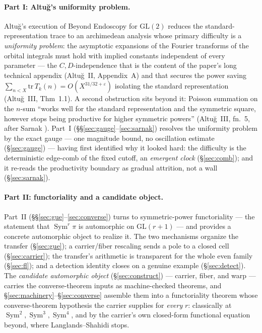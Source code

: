 \documentclass[11pt]{article}
\theoremstyle{definition}
\newcommand{\Sym}{\operatorname{Sym}}
\begin{document}
\paragraph{Part I: Altu\u{g}'s uniformity problem.} Altu\u{g}'s execution of Beyond Endoscopy for
$\mathrm{GL}(2)$ \cite{AltI,AltII,AltIII} reduces the standard-representation trace to an archimedean
analysis whose primary difficulty is a \emph{uniformity problem}: the asymptotic expansions of the
Fourier transforms of the orbital integrals must hold with implied constants independent of every
parameter --- the $C,D$-independence that is the content of the paper's long technical appendix
(Altu\u{g}~II, Appendix~A) and that secures the power saving
$\sum_{n<X}\mathrm{tr}\,T_k(n)=O(X^{31/32+\varepsilon})$ isolating the standard representation
(Altu\u{g}~III, Thm~1.1). A second obstruction sits beyond it: Poisson summation on the $n$-sum
``works well for the standard representation and the symmetric square, however stops being productive
for higher symmetric powers'' (Altu\u{g}~III, fn.~5, after Sarnak \cite{Sar}). Part~I
(\S\S\ref{sec:gauge}--\ref{sec:sarnak}) resolves the uniformity problem by the exact gauge --- one
magnitude bound, no oscillation estimate (\S\ref{sec:gauge}) --- having first identified why it looked
hard: the difficulty is the deterministic edge-comb of the fixed cutoff, an \emph{emergent clock}
(\S\ref{sec:comb}); and it re-reads the productivity boundary as gradual attrition, not a wall
(\S\ref{sec:sarnak}).

\paragraph{Part II: functoriality and a candidate object.} Part~II
(\S\S\ref{sec:gue}--\ref{sec:converse}) turns to symmetric-power functoriality --- the statement that
$\Sym^r\pi$ is automorphic on $\mathrm{GL}(r+1)$ --- and provides a concrete automorphic object to
realize it. The two mechanisms organize the transfer (\S\ref{sec:gue}); a carrier/fiber rescaling
sends a pole to a closed cell (\S\ref{sec:carrier}); the transfer's arithmetic is transparent for the
whole even family (\S\ref{sec:fl}); and a detection identity closes on a genuine example
(\S\ref{sec:detect}). The \emph{candidate automorphic object} (\S\ref{sec:construct}) --- carrier,
fiber, and warp --- carries the converse-theorem inputs as machine-checked theorems, and
\S\ref{sec:machinery}--\S\ref{sec:converse} assemble them into a functoriality theorem whose
converse-theorem hypothesis the carrier supplies for \emph{every} $r$: classically at
$\Sym^2,\Sym^3,\Sym^4$, and by the carrier's own closed-form functional equation beyond, where
Langlands--Shahidi stops.
\end{document}
